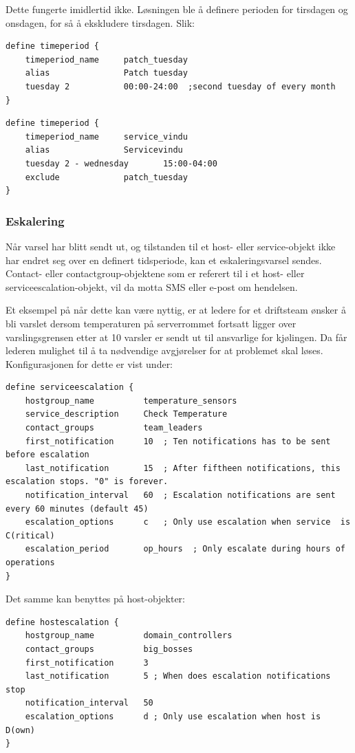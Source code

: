 Dette fungerte imidlertid ikke. Løsningen ble å definere perioden for tirsdagen og onsdagen, for så å ekskludere tirsdagen. Slik:
\begin{lstlisting}[style=example]
define timeperiod {
    timeperiod_name 	patch_tuesday
    alias           	Patch tuesday
    tuesday 2          	00:00-24:00  ;second tuesday of every month
}
\end{lstlisting}

\begin{lstlisting}[style=example]
define timeperiod {
    timeperiod_name     service_vindu
    alias				Servicevindu
    tuesday 2 - wednesday   	15:00-04:00
    exclude 			patch_tuesday
}
\end{lstlisting}

\subsubsection{Eskalering}
Når varsel har blitt sendt ut, og tilstanden til et host- eller service-objekt ikke har endret seg over en definert tidsperiode, kan et eskaleringsvarsel sendes. Contact- eller contactgroup-objektene som er referert til i et host- eller serviceescalation-objekt, vil da motta SMS eller e-post om hendelsen.

Et eksempel på når dette kan være nyttig, er at ledere for et driftsteam ønsker å bli varslet dersom temperaturen på serverrommet fortsatt ligger over varslingsgrensen etter at 10 varsler er sendt ut til ansvarlige for kjølingen. Da får lederen mulighet til å ta nødvendige avgjørelser for at problemet skal løses. Konfigurasjonen for dette er vist under:
\begin{lstlisting}[style=example]
define serviceescalation {
	hostgroup_name			temperature_sensors
	service_description		Check Temperature
	contact_groups			team_leaders
	first_notification		10	; Ten notifications has to be sent before escalation
	last_notification		15	; After fiftheen notifications, this escalation stops. "0" is forever.
	notification_interval	60 	; Escalation notifications are sent every 60 minutes (default 45)
	escalation_options		c	; Only use escalation when service  is C(ritical)
	escalation_period		op_hours  ; Only escalate during hours of operations
}
\end{lstlisting}
Det samme kan benyttes på host-objekter:
\begin{lstlisting}[style=example]
define hostescalation {
	hostgroup_name			domain_controllers
	contact_groups			big_bosses
	first_notification		3 	
	last_notification		5 ; When does escalation notifications stop
	notification_interval	50
	escalation_options		d ; Only use escalation when host is D(own)
}
\end{lstlisting}

